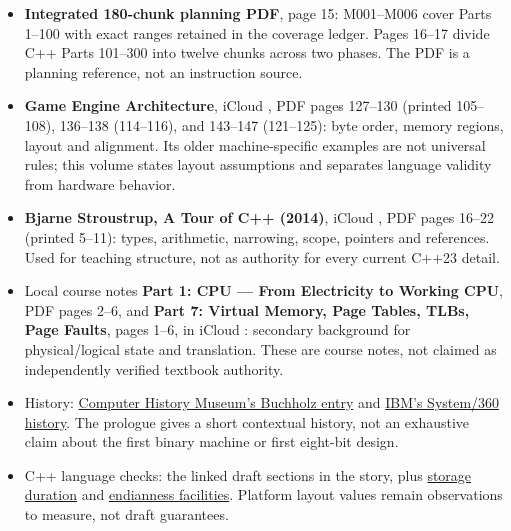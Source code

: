 \begin{itemize}
\tightlist
\item
  \textbf{Integrated 180-chunk planning PDF}, page 15: M001--M006 cover Parts 1--100 with exact ranges retained in the coverage ledger. Pages 16--17 divide C++ Parts 101--300 into twelve chunks across two phases. The PDF is a planning reference, not an instruction source.
\item
  \textbf{Game Engine Architecture}, iCloud , PDF pages 127--130 (printed 105--108), 136--138 (114--116), and 143--147 (121--125): byte order, memory regions, layout and alignment. Its older machine-specific examples are not universal rules; this volume states layout assumptions and separates language validity from hardware behavior.
\item
  \textbf{Bjarne Stroustrup, A Tour of C++ (2014)}, iCloud , PDF pages 16--22 (printed 5--11): types, arithmetic, narrowing, scope, pointers and references. Used for teaching structure, not as authority for every current C++23 detail.
\item
  Local course notes \textbf{Part 1: CPU --- From Electricity to Working CPU}, PDF pages 2--6, and \textbf{Part 7: Virtual Memory, Page Tables, TLBs, Page Faults}, pages 1--6, in iCloud : secondary background for physical/logical state and translation. These are course notes, not claimed as independently verified textbook authority.
\item
  History: \href{https://www.computerhistory.org/tdih/october/24/}{Computer History Museum's Buchholz entry} and \href{https://www.ibm.com/history/system-360}{IBM's System/360 history}. The prologue gives a short contextual history, not an exhaustive claim about the first binary machine or first eight-bit design.
\item
  C++ language checks: the linked draft sections in the story, plus \href{https://eel.is/c++draft/basic.stc}{storage duration} and \href{https://eel.is/c++draft/bit.endian}{endianness facilities}. Platform layout values remain observations to measure, not draft guarantees.
\end{itemize}

